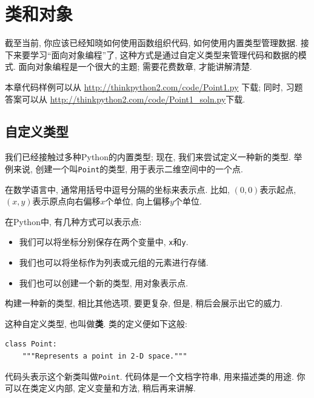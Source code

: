 \documentclass[10pt]{book}
\begin{document}
\chapter{类和对象}
\label{clobjects}

截至当前, 你应该已经知晓如何使用函数组织代码, 
如何使用内置类型管理数据. 
接下来要学习``面向对象编程''了, 
这种方式是通过自定义类型来管理代码和数据的模式. 
面向对象编程是一个很大的主题; 需要花费数章, 才能讲解清楚. 

本章代码样例可以从
\url{http://thinkpython2.com/code/Point1.py} 下载;
同时, 习题答案可以从
\url{http://thinkpython2.com/code/Point1_soln.py}下载.


\section{自定义类型}
\label{point}

我们已经接触过多种Python的内置类型;
现在, 我们来尝试定义一种新的类型. 
举例来说, 创建一个叫{\tt Point}的类型, 用于表示二维空间中的一个点. 

在数学语言中, 通常用括号中逗号分隔的坐标来表示点. 
比如, $(0,0)$表示起点, $(x,y)$表示原点向右偏移$x$个单位, 
向上偏移$y$个单位. 

在Python中, 有几种方式可以表示点:

\begin{itemize}

\item 我们可以将坐标分别保存在两个变量中, {\tt x}和{\tt y}. 

\item 我们也可以将坐标作为列表或元组的元素进行存储. 

\item 我们也可以创建一个新的类型, 用对象表示点. 

\end{itemize}

构建一种新的类型, 相比其他选项, 要更复杂, 
但是, 稍后会展示出它的威力. 

这种自定义类型, 也叫做{\bf 类}. 
类的定义便如下这般:

\begin{verbatim}
class Point:
    """Represents a point in 2-D space."""
\end{verbatim}
%
代码头表示这个新类叫做{\tt Point}. 
代码体是一个文档字符串, 用来描述类的用途. 
你可以在类定义内部, 定义变量和方法, 
稍后再来讲解. 
\end{document}
